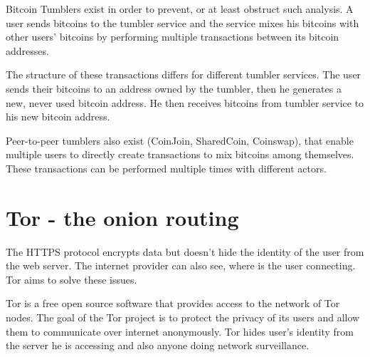\documentclass[
  digital, %
  table,   %
  lof,     %
  lot,     %
  oneside
]{fithesis3}
\begin{document}
Bitcoin Tumblers exist in order to prevent, or at least obstruct such analysis.
A user sends bitcoins to the tumbler service and the service mixes his bitcoins
with other users' bitcoins by performing multiple transactions
between its bitcoin addresses. \cite{moser2013inquiry}
  
The structure of these transactions differs for different tumbler services.
The user sends their bitcoins to an address owned by the tumbler,
then he generates a new, never used bitcoin address.
He then receives bitcoins from tumbler service to his new bitcoin address.

Peer-to-peer tumblers also exist (CoinJoin, SharedCoin, Coinswap),
that enable multiple users to directly create transactions to mix bitcoins among themselves.
These transactions can be performed multiple times with different actors.

\section{Tor - the onion routing}

The HTTPS protocol encrypts data but doesn't hide the identity of the user from the web server.
The internet provider can also see, where is the user connecting. Tor aims to solve these issues.
 
Tor \cite{dingledine2004tor} is a free open source software that provides access to the network of Tor nodes. 
The goal of the Tor project is to protect the privacy of its users and allow them to communicate
over internet anonymously.
Tor hides user's identity from the server he is accessing and also anyone doing network surveillance.
\end{document}
